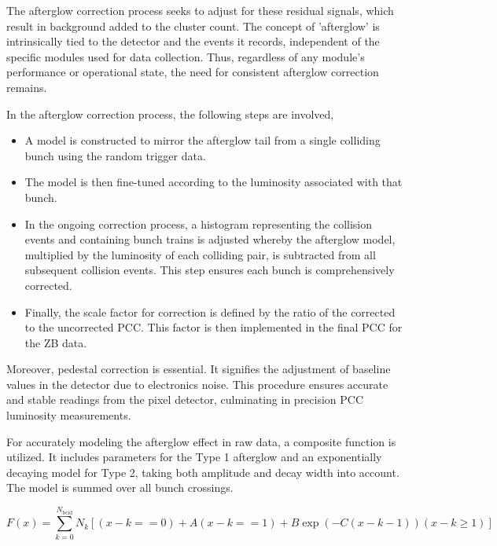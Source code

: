 The afterglow correction process seeks to adjust for these residual signals, which result in background added to the cluster count. The concept of 'afterglow' is intrinsically tied to the detector and the events it records, independent of the specific modules used for data collection. Thus, regardless of any module's performance or operational state, the need for consistent afterglow correction remains.

In the afterglow correction process, the following steps are involved,

\begin{itemize}
\item A model is constructed to mirror the afterglow tail from a single colliding bunch using the random trigger data.
\item The model is then fine-tuned according to the luminosity associated with that bunch.
\item In the ongoing correction process, a histogram representing the collision events and containing bunch trains is adjusted whereby the afterglow model, multiplied by the luminosity of each colliding pair, is subtracted from all subsequent collision events. This step ensures each bunch is comprehensively corrected.
\item Finally, the scale factor for correction is defined by the ratio of the corrected to the uncorrected PCC. This factor is then implemented in the final PCC for the ZB data. %
\end{itemize}

Moreover, pedestal correction is essential. It signifies the adjustment of baseline values in the detector due to electronics noise. This procedure ensures accurate and stable readings from the pixel detector, culminating in precision PCC luminosity measurements. %

For accurately modeling the afterglow effect in raw data, a composite function is utilized. It includes parameters for the Type 1 afterglow and an exponentially decaying model for Type 2, taking both amplitude and decay width into account. The model is summed over all bunch crossings.

\begin{equation}
F(x) = \sum_{k=0}^{N_{\text{bcid}}} N_k \left[ (x - k == 0) + A  (x - k == 1) + B  \exp(-C  (x - k - 1))  (x - k \geq 1) \right]
\end{equation}

